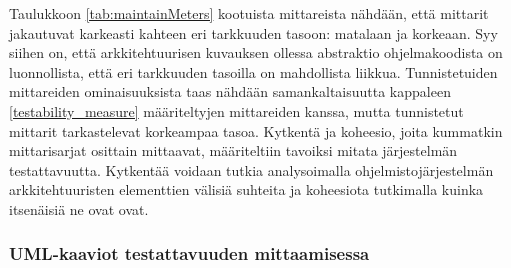 \documentclass[finnish]{tktltiki2}
\numberwithin{table}{section}
\theoremstyle{definition}
\theoremstyle{remark}
\begin{document}
\begin{table}[H]
	\centering
	\setlength{\extrarowheight}{4pt}%
\end{table}

\newpage

\noindent
Taulukkoon \ref{tab:maintainMeters} kootuista mittareista nähdään, että mittarit jakautuvat karkeasti kahteen eri tarkkuuden tasoon: matalaan ja korkeaan. Syy siihen on, että arkkitehtuurisen kuvauksen ollessa abstraktio ohjelmakoodista on luonnollista, että eri tarkkuuden tasoilla on mahdollista liikkua. Tunnistetuiden mittareiden ominaisuuksista taas nähdään samankaltaisuutta kappaleen \ref{testability_measure} määriteltyjen mittareiden kanssa, mutta tunnistetut mittarit tarkastelevat korkeampaa tasoa. Kytkentä ja koheesio, joita kummatkin mittarisarjat osittain mittaavat,  määriteltiin tavoiksi mitata järjestelmän testattavuutta. Kytkentää voidaan tutkia analysoimalla ohjelmistojärjestelmän arkkitehtuuristen elementtien välisiä suhteita ja koheesiota tutkimalla kuinka itsenäisiä ne ovat ovat.

\subsubsection{UML-kaaviot testattavuuden mittaamisessa} \label{uml_arch_test}
\end{document}

